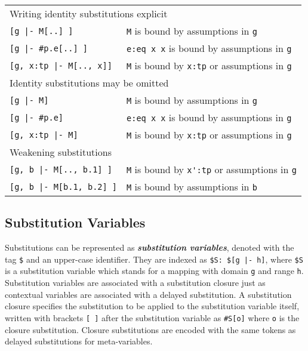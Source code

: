 \documentclass[11pt]{article}
\begin{document}
\begin{center}
\begin{tabular}{ l l}
\multicolumn{2}{l}{Writing identity substitutions explicit}\\[0.5em]
\verb+[g |- M[..] ]+ & \verb+M+ is bound by assumptions in \verb+g+\\
\verb+[g |- #p.e[..] ]+ & \verb+e:eq x x+ is bound by assumptions in \verb+g+\\
\verb+[g, x:tp |- M[.., x]]+ & \verb+M+ is bound by \verb+x:tp+ or assumptions in \verb+g+ \\[1em]
\multicolumn{2}{l}{Identity substitutions may be omitted}\\[0.5em]
\verb+[g |- M]+ & \verb+M+ is bound by assumptions in \verb+g+\\
\verb+[g |- #p.e]+ & \verb+e:eq x x+ is bound by assumptions in \verb+g+\\
\verb+[g, x:tp |- M]+ & \verb+M+ is bound by \verb+x:tp+ or assumptions in \verb+g+ \\[1em]
\multicolumn{2}{l}{Weakening substitutions}\\[0.5em]
\verb+[g, b |- M[.., b.1] ]+ & \verb+M+ is bound by \verb+x':tp+ or assumptions in \verb+g+ \\
\verb+[g, b |- M[b.1, b.2] ]+ & \verb+M+ is bound by assumptions in \verb+b+ \\
\end{tabular}
\end{center}



\subsection{Substitution Variables}

Substitutions can be represented as \textit{\textbf{substitution variables}}, denoted with the tag \verb+$+ and an upper-case identifier.
They are indexed as \verb+$S: $[g |- h]+, where \verb+$S+ is a substitution variable which stands for a mapping with domain \verb+g+ and range \verb+h+.
Substitution variables are associated with a substitution closure just as contextual variables are associated with a delayed substitution.
A substitution closure specifies the substitution to be applied to the substitution variable itself, written with brackets \verb+[ ]+ after the substitution variable as \verb+#S[o]+ where \verb+o+ is the closure substitution.
Closure substitutions are encoded with the same tokens as delayed substitutions for meta-variables.
\end{document}
